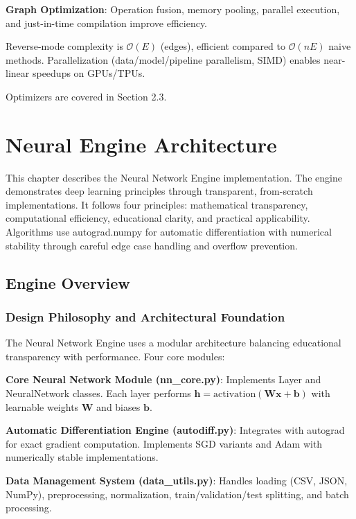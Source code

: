 \documentclass[11pt,a4paper]{report}
\begin{document}
\textbf{Graph Optimization}: Operation fusion, memory pooling, parallel execution, and just-in-time compilation improve efficiency.

Reverse-mode complexity is $\mathcal{O}(E)$ (edges), efficient compared to $\mathcal{O}(nE)$ naive methods. Parallelization (data/model/pipeline parallelism, SIMD) enables near-linear speedups on GPUs/TPUs.

Optimizers are covered in Section 2.3.


\chapter{Neural Engine Architecture}

This chapter describes the Neural Network Engine implementation. The engine demonstrates deep learning principles through transparent, from-scratch implementations. It follows four principles: mathematical transparency, computational efficiency, educational clarity, and practical applicability. Algorithms use autograd.numpy for automatic differentiation with numerical stability through careful edge case handling and overflow prevention.

\section{Engine Overview}

\subsection{Design Philosophy and Architectural Foundation}

The Neural Network Engine uses a modular architecture balancing educational transparency with performance. Four core modules:

\textbf{Core Neural Network Module (nn\_core.py)}: Implements Layer and NeuralNetwork classes. Each layer performs $\mathbf{h} = \text{activation}(\mathbf{W}\mathbf{x} + \mathbf{b})$ with learnable weights $\mathbf{W}$ and biases $\mathbf{b}$.

\textbf{Automatic Differentiation Engine (autodiff.py)}: Integrates with autograd for exact gradient computation. Implements SGD variants and Adam with numerically stable implementations.

\textbf{Data Management System (data\_utils.py)}: Handles loading (CSV, JSON, NumPy), preprocessing, normalization, train/validation/test splitting, and batch processing.
\end{document}
